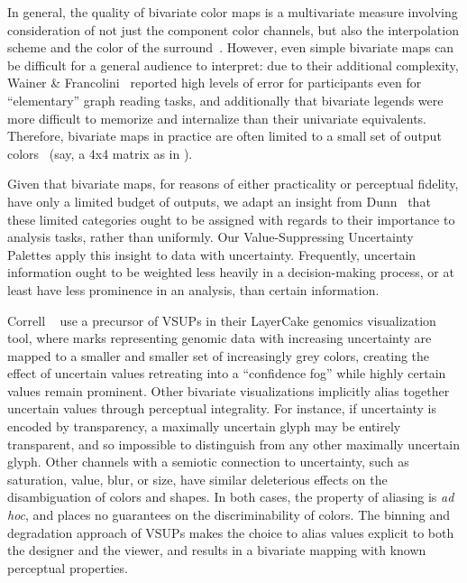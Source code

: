 In general, the quality of bivariate color maps is a multivariate measure involving consideration of not just the component color channels, but also the interpolation scheme and the color of the surround~\cite{bernard2015survey}. However, even simple bivariate maps can be difficult for a general audience to interpret: due to their additional complexity, Wainer \& Francolini~\cite{wainer1980empirical} reported high levels of error for participants even for ``elementary'' graph reading tasks, and additionally that bivariate legends were more difficult to memorize and internalize than their univariate equivalents. Therefore, bivariate maps in practice are often limited to a small set of output colors~\cite{robertson1986generation,trumbo1981theory} (say, a 4x4 matrix as in ).

Given that bivariate maps, for reasons of either practicality or perceptual fidelity, have only a limited budget of outputs, we adapt an insight from Dunn~\cite{dunn1989dynamic} that these limited categories ought to be assigned with regards to their importance to analysis tasks, rather than uniformly. Our Value-Suppressing Uncertainty Palettes apply this insight to data with uncertainty. Frequently, uncertain information ought to be weighted less heavily in a decision-making process, or at least have less prominence in an analysis, than certain information.

Correll \ea~\cite{correll2015layercake,correll2011visualizing} use a precursor of VSUPs in their LayerCake genomics visualization tool, where marks representing genomic data with increasing uncertainty are mapped to a smaller and smaller set of increasingly grey colors, creating the effect of uncertain values retreating into a ``confidence fog'' while highly certain values remain prominent. Other bivariate visualizations implicitly alias together uncertain values through perceptual integrality. For instance, if uncertainty is encoded by transparency, a maximally uncertain glyph may be entirely transparent, and so impossible to distinguish from any other maximally uncertain glyph. Other channels with a semiotic connection to uncertainty, such as saturation, value, blur, or size, have similar deleterious effects on the disambiguation of colors and shapes. In both cases, the property of aliasing is \emph{ad hoc}, and places no guarantees on the discriminability of colors. The binning and degradation approach of VSUPs makes the choice to alias values explicit to both the designer and the viewer, and results in a bivariate mapping with known perceptual properties.

